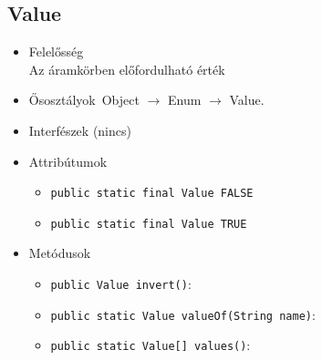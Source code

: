 \subsection{Value}
\begin{itemize}
\item Felelősség\\
Az áramkörben előfordulható érték
\item Ősosztályok\ Object $\rightarrow{}$ Enum $\rightarrow{}$ Value.
\item Interfészek (nincs)
\item Attribútumok $\ $
\begin{itemize}
	\item \texttt{public static final Value FALSE} 
	\item \texttt{public static final Value TRUE} 
\end{itemize}
\item Metódusok$\ $
\begin{itemize}
	\item \texttt{public Value invert()}: 
	\item \texttt{public static Value valueOf(String name)}: 
	\item \texttt{public static Value[] values()}: 
\end{itemize}
\end{itemize}

